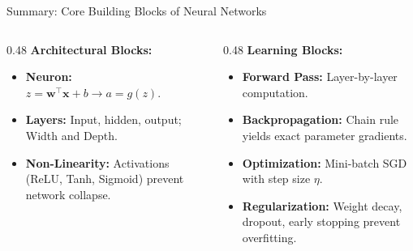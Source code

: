 \begin{frame}{Summary: Core Building Blocks of Neural Networks}
    \begin{columns}[T]
        \begin{column}{0.48\textwidth}
            \textbf{Architectural Blocks:}
            \begin{itemize}\footnotesize
                \item \textbf{Neuron:} $z = \mathbf{w}^\top \mathbf{x} + b \to a = g(z)$.
                \item \textbf{Layers:} Input, hidden, output; Width and Depth.
                \item \textbf{Non-Linearity:} Activations (ReLU, Tanh, Sigmoid) prevent network collapse.
            \end{itemize}
        \end{column}
        \begin{column}{0.48\textwidth}
            \textbf{Learning Blocks:}
            \begin{itemize}\footnotesize
                \item \textbf{Forward Pass:} Layer-by-layer computation.
                \item \textbf{Backpropagation:} Chain rule yields exact parameter gradients.
                \item \textbf{Optimization:} Mini-batch SGD with step size $\eta$.
                \item \textbf{Regularization:} Weight decay, dropout, early stopping prevent overfitting.
            \end{itemize}
        \end{column}
    \end{columns}
\end{frame}

